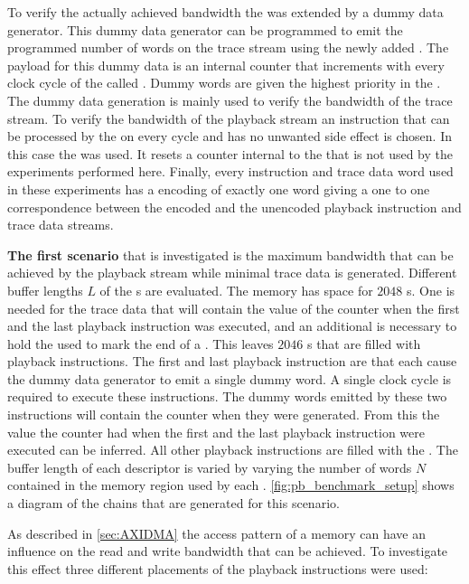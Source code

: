 To verify the actually achieved bandwidth the \pbexec{} was extended by a dummy data generator. This dummy data generator can be programmed to emit the programmed number of words on the trace stream using the newly added \emitDummyInstr{}. The payload for this dummy data is an \FPGA{} internal counter that increments with every clock cycle of the \pbexec{} called \systime{}. Dummy words are given the highest priority in the \traceArb{}.
The dummy data generation is mainly used to verify the bandwidth of the trace stream. To verify the bandwidth of the playback stream an instruction that can be processed by the \pbexec{} on every cycle and has no unwanted side effect is chosen. In this case the \resetSleepInstr{} was used. It resets a counter internal to the \pbexec{} that is not used by the experiments performed here. Finally, every instruction and trace data word used in these experiments has a \UT{} encoding of exactly one \PhyWordSize{} word giving a one to one correspondence between the encoded and the unencoded playback instruction and trace data streams.

\textbf{The first scenario} that is investigated is the maximum bandwidth that can be achieved by the playback stream while minimal trace data is generated. Different buffer lengths $L$ of the \descriptor{}s are evaluated. The \descriptor{} memory has space for $\num{2048}$ \descriptor{}s. One \descriptor{} is needed for the trace data that will contain the value of the \systime{} counter when the first and the last playback instruction was executed, and an additional \descriptor{} is necessary to hold the \haltInstr{} used to mark the end of a \PlaybackProgram{}. This leaves $\num{2046}$ \descriptor{}s that are filled with playback instructions. The first and last playback instruction are \emitDummyInstr{} that each cause the dummy data generator to emit a single dummy word. A single clock cycle is required to execute these instructions. The dummy words emitted by these two instructions will contain the \systime{} counter when they were generated. From this the value the \systime{} counter had when the first and the last playback instruction were executed can be inferred. All other playback instructions are filled with the \resetSleepInstr{}. The buffer length of each descriptor is varied by varying the number of words $N$ contained in the memory region used by each \descriptor{}. \autoref{fig:pb_benchmark_setup} shows a diagram of the \descriptor{} chains that are generated for this scenario.

As described in \autoref{sec:AXIDMA} the access pattern of a \DDR{} memory can have an influence on the read and write bandwidth that can be achieved. To investigate this effect three different placements of the playback instructions were used:

